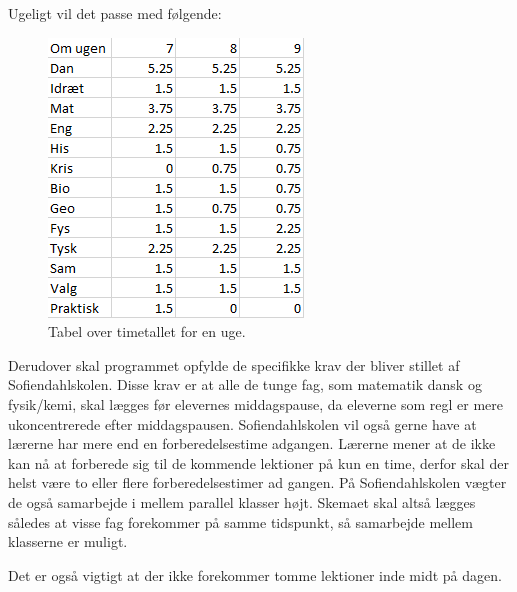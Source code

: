 Ugeligt vil det passe med følgende:
\begin{figure}[!h]
  \centering
  \includegraphics[width=\textwidth]{partials/graphics/antalaftimerpaaenuge.png}
  \caption{Tabel over timetallet for en uge.}
  \label{fig:Timetaluge}
\end{figure}

Derudover skal programmet opfylde de specifikke krav der bliver stillet af Sofiendahlskolen. Disse krav er at alle de tunge fag, som matematik dansk og fysik/kemi, skal lægges før elevernes middagspause, da eleverne som regl er mere ukoncentrerede efter middagspausen. Sofiendahlskolen vil også gerne have at lærerne har mere end en forberedelsestime adgangen. Lærerne mener at de ikke kan nå at forberede sig til de kommende lektioner på kun en time, derfor skal der helst være to eller flere forberedelsestimer ad gangen. På Sofiendahlskolen vægter de også samarbejde i mellem parallel klasser højt. Skemaet skal altså lægges således at visse fag forekommer på samme tidspunkt, så samarbejde mellem klasserne er muligt\cite{interview}. 

Det er også vigtigt at der ikke forekommer tomme lektioner inde midt på dagen.